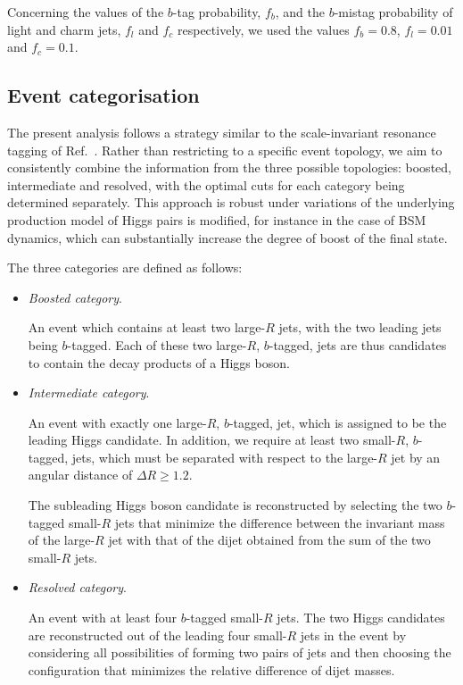 Concerning the values of the $b$-tag probability, $f_b$, and
the $b$-mistag probability of light and charm jets, $f_l$ and  $f_c$
respectively,
we used the values $f_b=0.8$, $f_l=0.01$
and  $f_c=0.1$.





\subsection{Event categorisation}
\label{sec:categorisation}

The present analysis follows a strategy similar to the
scale-invariant resonance tagging of Ref.~\cite{Gouzevitch:2013qca}.
%
Rather than restricting to a specific event topology,
we aim to consistently combine the information from
the three possible topologies: boosted, intermediate and
resolved, with the optimal cuts for each category being determined
separately.
%
This approach is robust
under variations of
the underlying production model of Higgs pairs is modified,
for instance in the case of
BSM dynamics, which can substantially increase
the degree of boost of the final state.


The three categories are defined as follows:
\begin{itemize}
\item {\it Boosted category}.

  An event which
  contains at least two large-$R$ jets, with the two leading jets
 being $b$-tagged.
 Each of these two large-$R$, $b$-tagged, jets are 
 thus candidates
 to contain the decay products of a Higgs boson.

\item {\it Intermediate category}.

  An event with exactly one large-$R$, $b$-tagged, jet, which
  is assigned to be the leading Higgs candidate.
  In addition, we require at least two small-$R$, $b$-tagged, jets,
  which must be separated with respect to the large-$R$ jet
  by an angular distance of $\Delta R\ge 1.2$.
    
  The subleading Higgs boson candidate is reconstructed
  by selecting the two $b$-tagged small-$R$ jets that minimize the difference
  between the invariant mass of the large-$R$ jet
  with that of the dijet obtained
  from the sum of the two small-$R$ jets.
  
\item {\it Resolved category}.

  
 An event with at least
  four $b$-tagged small-$R$ jets.
  The two Higgs candidates are reconstructed out of the
  leading four small-$R$ jets in the event
  by considering all possibilities of forming two pairs of jets
  and then choosing the configuration that minimizes the relative difference of
  dijet masses.
  
\end{itemize}


